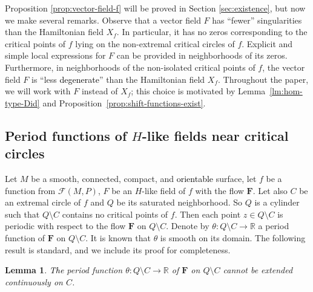 \documentclass[10pt,reqno]{amsart}
\newtheorem{lemma}[subsection]{Lemma}
\newcommand{\bbR}{\mathbb{R}}
\newcommand{\bfF}{\mathbf{F}}
\newcommand{\F}{\mathcal{F}(M,P)}
\newcommand{\textr}[1]{\textcolor{black}{#1}}
\begin{document}
Proposition \ref{prop:vector-field-f} will be proved in Section \ref{sec:existence}, but now
we make several remarks.
Observe that a vector field $F$ has ``fewer'' singularities than the Hamiltonian field $X_f$. In particular, it has no zeros corresponding to the critical points of $f$ lying on the non-extremal critical circles of $f$. Explicit and simple local expressions for $F$ can be provided in neighborhoods of its zeros. Furthermore, in neighborhoods of the non-isolated critical points of $f$, the vector field $F$ is ``less  \textr{degenerate}'' than the Hamiltonian field $X_f$.
Throughout the paper, we will work with $F$ instead of $X_f$; this choice is motivated by Lemma~\ref{lm:hom-type-Did} and Proposition~\ref{prop:shift-functions-exist}.




\subsection{Period functions of $H$-like fields near critical circles}
Let $M$ be a smooth, connected, compact, and  \textr{orientable} surface, let $f$ be a function from $\F$, $F$ be an $H$-like field of $f$ with the flow $\bfF$. Let also $C$ be an extremal circle of $f$ and $Q$ be its saturated neighborhood.  So $Q$ is a cylinder such that $Q\setminus C$ contains no critical points of $f$.  Then each point $z\in Q\setminus C$ is periodic with respect to the flow $\bfF$ on $Q\setminus C$. Denote by $\theta:Q\setminus C\to \bbR$ a period function of $\bfF$ on $Q\setminus C$. It is known that $\theta$ is smooth on its domain.
The following result is standard, and we include its proof for completeness.
\begin{lemma}\label{lm:period}
\textr{The} period function $\theta:Q\setminus C\to \bbR$ of $\bfF$ on $Q\setminus C$ cannot be extended continuously  on $C$.
\end{lemma} 
\end{document}
